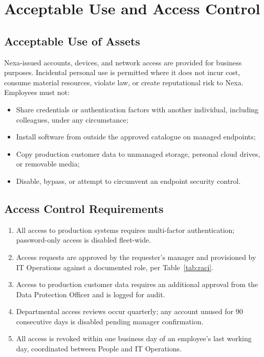 \section{Acceptable Use and Access Control}

\subsection{Acceptable Use of Assets}
Nexa-issued accounts, devices, and network access are provided for business purposes.
Incidental personal use is permitted where it does not incur cost, consume material
resources, violate law, or create reputational risk to Nexa. Employees must not:
\begin{itemize}[topsep=2pt, itemsep=2pt]
  \item Share credentials or authentication factors with another individual, including
        colleagues, under any circumstance;
  \item Install software from outside the approved catalogue on managed endpoints;
  \item Copy production customer data to unmanaged storage, personal cloud drives, or
        removable media;
  \item Disable, bypass, or attempt to circumvent an endpoint security control.
\end{itemize}

\subsection{Access Control Requirements}
\begin{enumerate}[topsep=2pt, itemsep=3pt]
  \item All access to production systems requires multi-factor authentication; password-only
        access is disabled fleet-wide.
  \item Access requests are approved by the requester's manager and provisioned by IT
        Operations against a documented role, per Table~\ref{tab:raci}.
  \item Access to production customer data requires an additional approval from the Data
        Protection Officer and is logged for audit.
  \item Departmental access reviews occur quarterly; any account unused for 90 consecutive
        days is disabled pending manager confirmation.
  \item All access is revoked within one business day of an employee's last working day,
        coordinated between People and IT Operations.
\end{enumerate}

